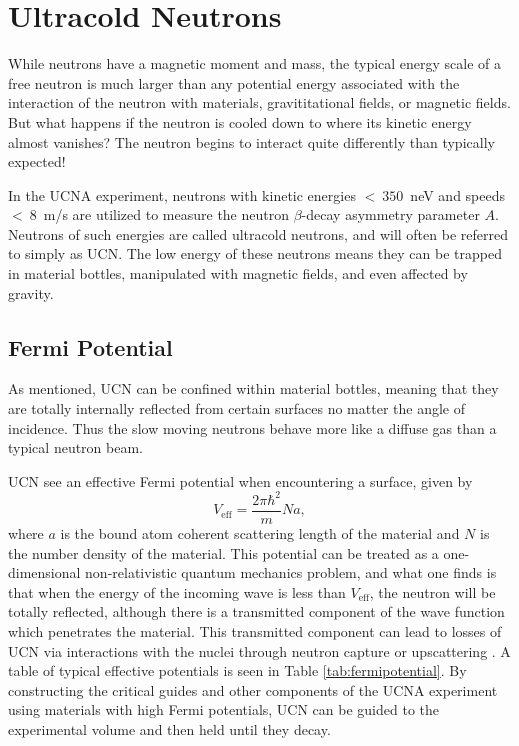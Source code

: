 \section{Ultracold Neutrons}

While neutrons have a magnetic moment and mass, the typical energy scale
of a free neutron is much larger than any potential energy associated with
the interaction of the neutron with materials, gravititational fields,
or magnetic fields. But what happens if the neutron is cooled down
to where its kinetic energy almost vanishes? The neutron begins to interact
quite differently than typically expected!

In the UCNA experiment, neutrons
with kinetic energies $<~350$~neV and speeds $<~8$~m/s are utilized to measure
the neutron $\beta$-decay asymmetry parameter $A$. Neutrons of such energies
are called ultracold neutrons, and will often be referred to simply as UCN. The
low energy of these neutrons means they can be trapped in material bottles, manipulated
with magnetic fields, and even affected by gravity.

\subsection{Fermi Potential} \label{sssec:fermipotential}

As mentioned, UCN can be confined within material bottles, meaning that they are
totally internally reflected from certain surfaces no matter the angle of incidence.
Thus the slow moving neutrons behave more like a diffuse gas than a typical neutron
beam.

UCN see an effective Fermi potential when encountering a surface, given by
%
\begin{equation}
  V_{\mathrm{eff}} = \frac{2\pi\hbar^2}{m}Na,
\end{equation}
where $a$ is the bound atom coherent scattering length of the material and $N$ is the number density of
the material. This potential can be treated as a one-dimensional non-relativistic quantum mechanics problem,
and what one finds is that when the energy of the incoming wave is less than $V_{\mathrm{eff}}$, the neutron will be
totally reflected, although there is a transmitted component of the wave function which penetrates the
material. This transmitted component can lead to losses of UCN via interactions with the nuclei through
neutron capture or upscattering \cite{golub1991ultra}. A table of typical effective potentials is seen
in Table \ref{tab:fermipotential}.
By constructing the critical guides and other components of the UCNA experiment using materials with high
Fermi potentials, UCN can be guided to the experimental volume and then held until they decay.

